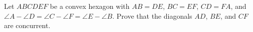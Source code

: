 Let $ABCDEF$ be a convex hexagon with $AB = DE$, $BC = EF$, $CD = FA$, and $\angle A - \angle D = \angle C - \angle F = \angle E - \angle B$. Prove that the diagonals $AD$, $BE$, and $CF$ are concurrent.
